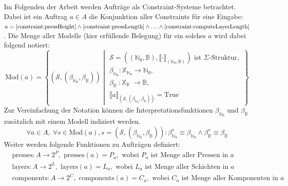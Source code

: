 Im Folgenden der Arbeit werden Aufträge als Constraint-Systeme betrachtet.
Dabei ist ein Auftrag $a \in A$ die Konjunktion aller Constraints für eine Eingabe:
$a = \ref{constraint:pressHeight} \land \ref{constraint:pressLength} \land \ldots \land \ref{constraint:computeLayerLength}$.
Die Menge aller Modelle (hier erfüllende Belegung) für ein solches $a$ wird dabei folgend notiert:
\[
    \text{Mod}(a) = \left\{
        (\mathcal{S}, (\beta_{\mathbb{N}_0}, \beta_{\mathbb{B}})) \middle|
            \begin{array}{l}
                \mathcal{S} = ((\mathbb{N}_0, \mathbb{B}), \llbracket \cdot \rrbracket_{(\mathbb{N}_0, \mathbb{B})}) \text{ ist } \Sigma\text{-Struktur}, \\
                \beta_{\mathbb{N}_0}: \mathbb{X}_{\mathbb{N}_0} \rightarrow \mathbb{N}_0, \\
                \beta_{\mathbb{B}_{\phantom{0}}}: \mathbb{X}_{\mathbb{B}_{\phantom{0}}} \rightarrow \mathbb{B}, \\
                \llbracket a \rrbracket_{(\mathcal{S}, (\beta_{\mathbb{N}_0}, \beta_{\mathbb{B}}))} = \text{True}
            \end{array}
    \right\}
\]
Zur Vereinfachung der Notation können die Interpretationsfunktionen $\beta_{\mathbb{N}_0}$ und $\beta_{\mathbb{B}}$ zusätzlich mit einem Modell indiziert werden.
\[
    \forall a \in A, \; \forall s \in \text{Mod}(a), s = (\mathcal{S}, (\beta_{\mathbb{N}_0}, \beta_{\mathbb{B}})): \beta_{\mathbb{N}_0}^s \equiv \beta_{\mathbb{N}_0} \land \beta_{\mathbb{B}}^s \equiv \beta_{\mathbb{B}}
\]
Weiter werden folgende Funktionen zu Aufträgen definiert:
\begin{align*}
    & \text{presses}: A \rightarrow 2^P, \text{ presses}(a) = P_a, \text{ wobei } P_a \text{ ist Menge aller Pressen in } a \\
    & \text{layers}: A \rightarrow 2^L, \text{ layers}(a) = L_a, \text{ wobei } L_a \text{ ist Menge aller Schichten in } a \\
    & \text{components}: A \rightarrow 2^C, \text{ components}(a) = C_a, \text{ wobei } C_a \text{ ist Menge aller Komponenten in } a \\
\end{align*}

